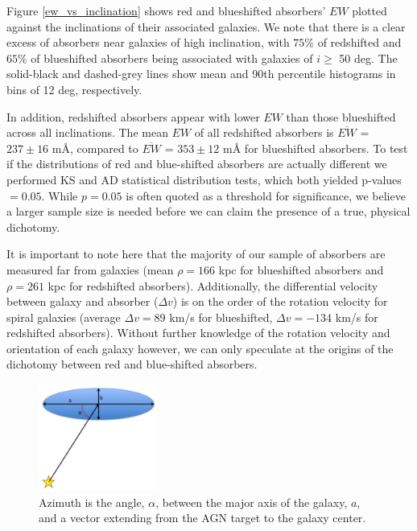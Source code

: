 \documentclass[iop]{emulateapj-rtx4}
\begin{document}
Figure \ref{ew_vs_inclination} shows red and blueshifted absorbers' $EW$ plotted against the inclinations of their associated galaxies. We note that there is a clear excess of absorbers near galaxies of high inclination, with $75\%$ of redshifted and $65\%$ of blueshifted absorbers being associated with galaxies of $i \geq$ 50 deg. The solid-black and dashed-grey lines show mean and 90th percentile histograms in bins of 12 deg, respectively. 

In addition, redshifted absorbers appear with lower $EW$ than those blueshifted across all inclinations. The mean $EW$ of all redshifted absorbers is $\overline{EW}$ = $237 \pm 16$  $\textrm{m\AA}$, compared to $\overline{EW}$ = $353 \pm 12$ $\textrm{m\AA}$ for blueshifted absorbers. To test if the distributions of red and blue-shifted absorbers are actually different we performed KS and AD statistical distribution tests, which both yielded p-values $=0.05$. While $p=0.05$ is often quoted as a threshold for significance, we believe a larger sample size is needed before we can claim the presence of a true, physical dichotomy.

It is important to note here that the majority of our sample of absorbers are measured far from galaxies (mean $\rho = 166$ kpc for blueshifted absorbers and $\rho = 261$ kpc for redshifted absorbers). Additionally, the differential velocity between galaxy and absorber ($\Delta v$) is on the order of the rotation velocity for spiral galaxies (average $\Delta v = 89$ km/s for blueshifted, $\Delta v = -134$ km/s for redshifted absorbers). Without further knowledge of the rotation velocity and orientation of each galaxy however, we can only speculate at the origins of the dichotomy between red and blue-shifted absorbers.

\begin{figure}[ht!]
        \centering
        \includegraphics[width=0.35\textwidth]{azimuth_illustration_cut.jpg}
        \caption{\small{Azimuth is the angle, $\alpha$, between the major axis of the galaxy, $a$, and a vector extending from the AGN target to the galaxy center.}}
        \label{azimuth_illustration}
\end{figure} 
\end{document}
